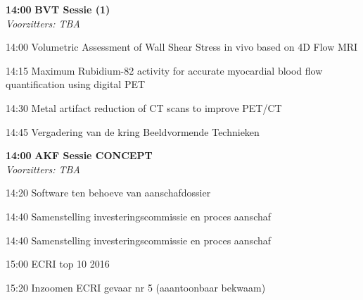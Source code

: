 \documentclass[a4paper,10pt]{report}
\begin{document}
\begin{multicols*}{3}
\begin{packed_enum}
\item[\textbf{14:00}]\textbf{BVT Sessie (1)}\\\textit{Voorzitters: TBA}
\item[14:00] Volumetric Assessment of Wall Shear Stress in vivo based on 4D Flow MRI 
\item[14:15] Maximum Rubidium-82 activity for accurate myocardial blood flow quantification using digital PET 
\item[14:30] Metal artifact reduction of CT scans to improve PET/CT 
\item[14:45] Vergadering van de kring Beeldvormende Technieken
\end{packed_enum} %
 
\vfill

\begin{packed_enum}
\item[\textbf{14:00}] \textbf{AKF Sessie CONCEPT }\\\textit{Voorzitters: TBA}
\item[14:20] Software ten behoeve van aanschafdossier
\item[14:40] Samenstelling investeringscommissie en proces aanschaf
\item[14:40] Samenstelling investeringscommissie en proces aanschaf
\item[15:00] ECRI top 10 2016
\item[15:20] Inzoomen ECRI gevaar nr 5 (aaantoonbaar bekwaam)
\end{packed_enum} %


\end{multicols*}
\end{document}
